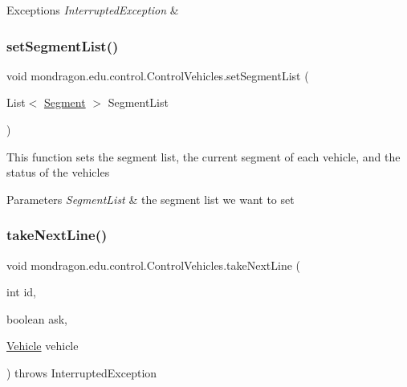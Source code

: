 \begin{DoxyExceptions}{Exceptions}
{\em Interrupted\+Exception} & \\
\hline
\end{DoxyExceptions}
\mbox{\label{classmondragon_1_1edu_1_1control_1_1_control_vehicles_a3752f0ee665a4212470882d084bfaa67}} 
\subsubsection{\texorpdfstring{setSegmentList()}{setSegmentList()}}
{\footnotesize\ttfamily void mondragon.\+edu.\+control.\+Control\+Vehicles.\+set\+Segment\+List (\begin{DoxyParamCaption}\item[{List$<$ \mbox{\hyperlink{classmondragon_1_1edu_1_1clases_1_1_segment}{Segment}} $>$}]{Segment\+List }\end{DoxyParamCaption})\hspace{0.3cm}{\ttfamily [inline]}}

This function sets the segment list, the current segment of each vehicle, and the status of the vehicles


\begin{DoxyParams}{Parameters}
{\em Segment\+List} & the segment list we want to set \\
\hline
\end{DoxyParams}
\mbox{\label{classmondragon_1_1edu_1_1control_1_1_control_vehicles_ae3b614402c3b897174c7a2a81bc816ca}} 
\subsubsection{\texorpdfstring{takeNextLine()}{takeNextLine()}}
{\footnotesize\ttfamily void mondragon.\+edu.\+control.\+Control\+Vehicles.\+take\+Next\+Line (\begin{DoxyParamCaption}\item[{int}]{id,  }\item[{boolean}]{ask,  }\item[{\mbox{\hyperlink{classmondragon_1_1edu_1_1clases_1_1_vehicle}{Vehicle}}}]{vehicle }\end{DoxyParamCaption}) throws Interrupted\+Exception\hspace{0.3cm}{\ttfamily [inline]}}

